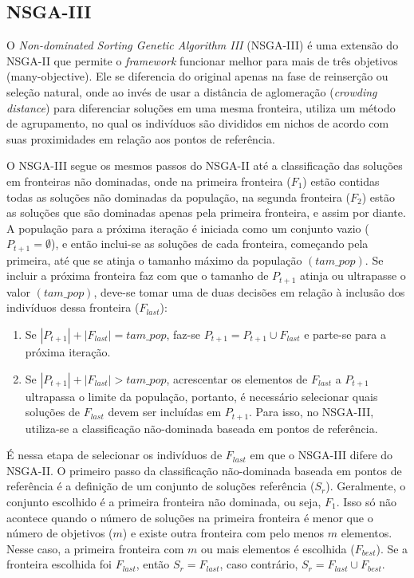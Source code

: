 \FloatBarrier
\subsection{NSGA-III}

O \textit{Non-dominated Sorting Genetic Algorithm III} (NSGA-III) \cite{Deb2014} é uma extensão do NSGA-II que permite o \textit{framework} funcionar melhor para mais de três objetivos (many-objective). Ele se diferencia do original apenas na fase de reinserção ou seleção natural, onde ao invés de usar a distância de aglomeração (\textit{crowding distance}) para diferenciar soluções em uma mesma fronteira, utiliza um método de agrupamento, no qual os indivíduos são divididos em nichos de acordo com suas proximidades em relação aos pontos de referência.

O NSGA-III segue os mesmos passos do NSGA-II até a classificação das soluções em fronteiras não dominadas, onde na primeira fronteira ($F_1$) estão contidas todas as soluções não dominadas da população, na segunda fronteira ($F_2$) estão as soluções que são dominadas apenas pela primeira fronteira, e assim por diante. A população para a próxima iteração é iniciada como um conjunto vazio ($P_{t+1} = \emptyset$), e então inclui-se as soluções de cada fronteira, começando pela primeira, até que se atinja o tamanho máximo da população $(tam\_pop)$. Se incluir a próxima fronteira faz com que o tamanho de $P_{t+1}$ atinja ou ultrapasse o valor $(tam\_pop)$, deve-se tomar uma de duas decisões em relação à inclusão dos indivíduos dessa fronteira ($F_{last}$):

\begin{enumerate}
	\item Se $|P_{t+1}| + |F_{last}| = tam\_pop$, faz-se $P_{t+1} = P_{t+1} \cup F_{last}$ e parte-se para a próxima iteração.
	\item Se $|P_{t+1}| + |F_{last}| > tam\_pop$, acrescentar os elementos de $F_{last}$ a $P_{t+1}$ ultrapassa o limite da população, portanto, é necessário selecionar quais soluções de $F_{last}$ devem ser incluídas em $P_{t+1}$. Para isso, no NSGA-III, utiliza-se a classificação não-dominada baseada em pontos de referência.
\end{enumerate}

É nessa etapa de selecionar os indivíduos de $F_{last}$ em que o NSGA-III difere do NSGA-II. O primeiro passo da classificação não-dominada baseada em pontos de referência é a definição de um conjunto de soluções referência ($S_r$). Geralmente, o conjunto escolhido é a primeira fronteira não dominada, ou seja, $F_1$. Isso só não acontece quando o número de soluções na primeira fronteira é menor que o número de objetivos ($m$) e existe outra fronteira com pelo menos $m$ elementos. Nesse caso, a primeira fronteira com $m$ ou mais elementos é escolhida ($F_{best}$). Se a fronteira escolhida foi $F_{last}$, então $S_r = F_{last}$, caso contrário, $S_r = F_{last} \cup F_{best}$.

